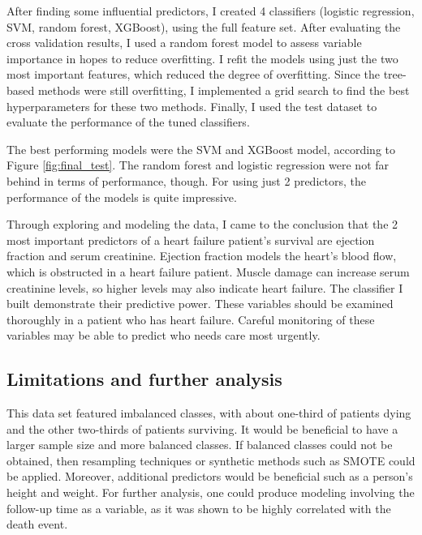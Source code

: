 \documentclass[12pt, letterpaper]{article}
\begin{document}
	After finding some influential predictors, I created 4 classifiers (logistic regression, SVM, random forest, XGBoost), using the full feature set. After evaluating the cross validation results, I used a random forest model to assess variable importance in hopes to reduce overfitting. I refit the models using just the two most important features, which reduced the degree of overfitting. Since the tree-based methods were still overfitting, I implemented a grid search to find the best hyperparameters for these two methods. Finally, I used the test dataset to evaluate the performance of the tuned classifiers.
	
	The best performing models were the SVM and XGBoost model, according to Figure \ref{fig:final_test}. The random forest and logistic regression were not far behind in terms of performance, though. For using just 2 predictors, the performance of the models is quite impressive.
	
	Through exploring and modeling the data, I came to the conclusion that the 2 most important predictors of a heart failure patient's survival are ejection fraction and serum creatinine. Ejection fraction models the heart's blood flow, which is obstructed in a heart failure patient. Muscle damage can increase serum creatinine levels, so higher levels may also indicate heart failure. The classifier I built demonstrate their predictive power. These variables should be examined thoroughly in a patient who has heart failure. Careful monitoring of these variables may be able to predict who needs care most urgently.
	
	\subsection{Limitations and further analysis}
	
	This data set featured imbalanced classes, with about one-third of patients dying and the other two-thirds of patients surviving. It would be beneficial to have a larger sample size and more balanced classes. If balanced classes could not be obtained, then resampling techniques or synthetic methods such as SMOTE could be applied. Moreover, additional predictors would be beneficial such as a person's height and weight. For further analysis, one could produce modeling involving the follow-up time as a variable, as it was shown to be highly correlated with the death event.
	
\nocite{*}
	

\end{document}

